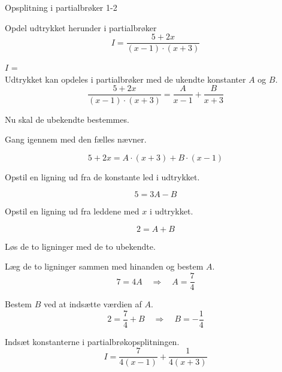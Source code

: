 \documentclass{article}
\begin{document}
\begin{exercise}{Opsplitning i partialbrøker 1-2}
	
	Opdel udtrykket herunder i partialbrøker
	\[
	I = \frac{5 + 2x}{(x - 1) \cdot (x + 3)}
	\]
	
	$I$ =  \\
	
	\hint
	Udtrykket kan opdeles i partialbrøker med de ukendte konstanter $A$ og $B$.
	\[
	\frac{5 + 2x}{(x - 1) \cdot (x + 3)} = 
	\frac{A}{x - 1} + \frac{B}{x + 3}
	\]
	
	\hint
	Nu skal de ubekendte bestemmes.
	
	\hint
	Gang igennem med den fælles nævner.
	
	\hint
	\[
	5 + 2x = A \cdot (x + 3) + B \cdot (x - 1)
	\]
	
	\hint
	Opstil en ligning ud fra de konstante led i udtrykket.
	
	\hint
	\[
	5 = 3A - B
	\]
	
	\hint
	Opstil en ligning ud fra leddene med $x$ i udtrykket.
	
	\hint
	\[
	2 = A + B
	\]
	
	\hint
	Løs de to ligninger med de to ubekendte.
	
	\hint
	Læg de to ligninger sammen med hinanden og bestem $A$.
	\[
	7 = 4A \quad	\Rightarrow		\quad		A = \frac{7}{4}
	\]
	
	\hint
	Bestem $B$ ved at indsætte værdien af $A$.
	\[
	2 =  \frac{7}{4} + B \quad 	\Rightarrow		\quad B = -\frac{1}{4}
	\]
	
	\hint
	Indsæt konstanterne i partialbrøkopsplitningen.
	\[
	I = \frac{7}{4(x-1)} + \frac{1}{4(x+3)}
	\]
	
	
	
\end{exercise}
\end{document}
